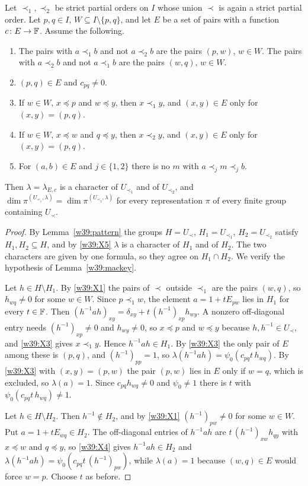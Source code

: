 \begin{lemma}[exchange]\label{w39:exchange}
Let $\prec_1,\prec_2$ be strict partial orders on $I$ whose union $\prec$ is again a strict partial order. Let $p,q\in I$, $W\subseteq I\setminus\{p,q\}$, and let $E$ be a set of pairs with a function $c\colon E\to\mathbb F$. Assume the following.
\begin{enumerate}[label=(X\arabic*),leftmargin=*]
\item\label{w39:X1} The pairs with $a\prec_1b$ and not $a\prec_2b$ are the pairs $(p,w)$, $w\in W$. The pairs with $a\prec_2b$ and not $a\prec_1b$ are the pairs $(w,q)$, $w\in W$.
\item\label{w39:X2} $(p,q)\in E$ and $c_{pq}\ne0$.
\item\label{w39:X3} If $w\in W$, $x\preceq p$ and $w\preceq y$, then $x\prec_1y$, and $(x,y)\in E$ only for $(x,y)=(p,q)$.
\item\label{w39:X4} If $w\in W$, $x\preceq w$ and $q\preceq y$, then $x\prec_2y$, and $(x,y)\in E$ only for $(x,y)=(p,q)$.
\item\label{w39:X5} For $(a,b)\in E$ and $j\in\{1,2\}$ there is no $m$ with $a\prec_jm\prec_jb$.
\end{enumerate}
Then $\lambda=\lambda_{E,c}$ is a character of $U_{\prec_1}$ and of $U_{\prec_2}$, and $\dim\pi^{(U_{\prec_1},\lambda)}=\dim\pi^{(U_{\prec_2},\lambda)}$ for every representation $\pi$ of every finite group containing $U_\prec$.
\end{lemma}

\begin{proof}
By Lemma~\ref{w39:pattern} the groups $H=U_\prec$, $H_1=U_{\prec_1}$, $H_2=U_{\prec_2}$ satisfy $H_1,H_2\subseteq H$, and by \ref{w39:X5} $\lambda$ is a character of $H_1$ and of $H_2$. The two characters are given by one formula, so they agree on $H_1\cap H_2$. We verify the hypothesis of Lemma~\ref{w39:mackey}.

Let $h\in H\setminus H_1$. By \ref{w39:X1} the pairs of $\prec$ outside $\prec_1$ are the pairs $(w,q)$, so $h_{wq}\ne0$ for some $w\in W$. Since $p\prec_1w$, the element $a=1+tE_{pw}$ lies in $H_1$ for every $t\in\mathbb F$. Then $(h^{-1}ah)_{xy}=\delta_{xy}+t\,(h^{-1})_{xp}h_{wy}$. A nonzero off-diagonal entry needs $(h^{-1})_{xp}\ne0$ and $h_{wy}\ne0$, so $x\preceq p$ and $w\preceq y$ because $h,h^{-1}\in U_\prec$, and \ref{w39:X3} gives $x\prec_1y$. Hence $h^{-1}ah\in H_1$. By \ref{w39:X3} the only pair of $E$ among these is $(p,q)$, and $(h^{-1})_{pp}=1$, so $\lambda(h^{-1}ah)=\psi_0(c_{pq}t\,h_{wq})$. By \ref{w39:X3} with $(x,y)=(p,w)$ the pair $(p,w)$ lies in $E$ only if $w=q$, which is excluded, so $\lambda(a)=1$. Since $c_{pq}h_{wq}\ne0$ and $\psi_0\ne1$ there is $t$ with $\psi_0(c_{pq}t\,h_{wq})\ne1$.

Let $h\in H\setminus H_2$. Then $h^{-1}\notin H_2$, and by \ref{w39:X1} $(h^{-1})_{pw}\ne0$ for some $w\in W$. Put $a=1+tE_{wq}\in H_2$. The off-diagonal entries of $h^{-1}ah$ are $t\,(h^{-1})_{xw}h_{qy}$ with $x\preceq w$ and $q\preceq y$, so \ref{w39:X4} gives $h^{-1}ah\in H_2$ and $\lambda(h^{-1}ah)=\psi_0(c_{pq}t\,(h^{-1})_{pw})$, while $\lambda(a)=1$ because $(w,q)\in E$ would force $w=p$. Choose $t$ as before.
\end{proof}

